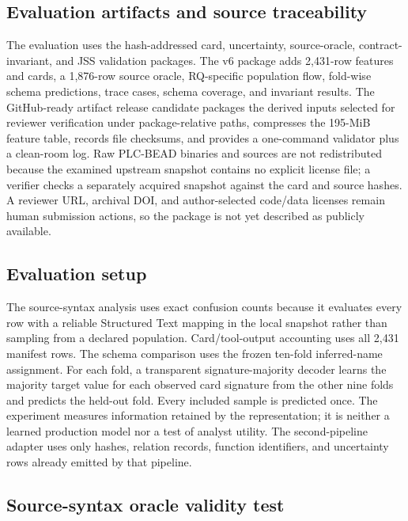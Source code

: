 \documentclass[manuscript,screen,review]{acmart}
\begin{document}
\subsection{Evaluation artifacts and source traceability}

The evaluation uses the hash-addressed card, uncertainty, source-oracle, contract-invariant, and JSS validation packages. The v6 package adds 2{,}431-row features and cards, a 1{,}876-row source oracle, RQ-specific population flow, fold-wise schema predictions, trace cases, schema coverage, and invariant results. The GitHub-ready artifact release candidate packages the derived inputs selected for reviewer verification under package-relative paths, compresses the 195-MiB feature table, records file checksums, and provides a one-command validator plus a clean-room log. Raw PLC-BEAD binaries and sources are not redistributed because the examined upstream snapshot contains no explicit license file; a verifier checks a separately acquired snapshot against the card and source hashes. A reviewer URL, archival DOI, and author-selected code/data licenses remain human submission actions, so the package is not yet described as publicly available.

\subsection{Evaluation setup}

The source-syntax analysis uses exact confusion counts because it evaluates every row with a reliable Structured Text mapping in the local snapshot rather than sampling from a declared population. Card/tool-output accounting uses all 2{,}431 manifest rows. The schema comparison uses the frozen ten-fold inferred-name assignment. For each fold, a transparent signature-majority decoder learns the majority target value for each observed card signature from the other nine folds and predicts the held-out fold. Every included sample is predicted once. The experiment measures information retained by the representation; it is neither a learned production model nor a test of analyst utility. The second-pipeline adapter uses only hashes, relation records, function identifiers, and uncertainty rows already emitted by that pipeline.

\subsection{Source-syntax oracle validity test}
\label{sec:source_oracle}
\end{document}

